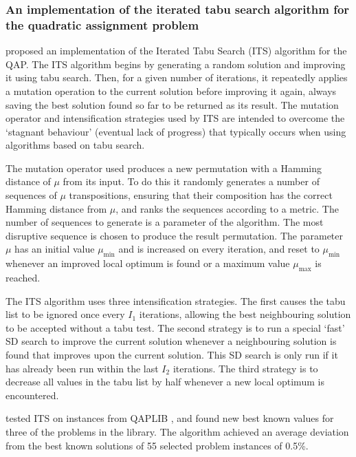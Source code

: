 {	%


    \subsubsection*{An implementation of the iterated tabu search algorithm for the quadratic assignment problem} {
    	\citet{Misevicius:2012dj} proposed an implementation of the Iterated Tabu Search (ITS) algorithm for the QAP.
    	The ITS algorithm begins by generating a random solution and improving it using tabu search. Then, for a given number of iterations, it repeatedly applies a mutation operation to the current solution before improving it again, always saving the best solution found so far to be returned as its result. The mutation operator and intensification strategies used by ITS are intended to overcome the `stagnant behaviour' (eventual lack of progress) that typically occurs when using algorithms based on tabu search.

    	The mutation operator used produces a new permutation with a Hamming distance of \(\mu\) from its input. To do this it randomly generates a number of sequences of \(\mu\) transpositions, ensuring that their composition has the correct Hamming distance from \(\mu\), and ranks the sequences according to a  metric. The number of sequences to generate is a parameter of the algorithm. The most disruptive sequence is chosen to produce the result permutation.
    	The parameter \(\mu\) has an initial value \(\mu_\text{min}\) and is increased on every iteration, and reset to \(\mu_\text{min}\) whenever an improved local optimum is found or a maximum value \(\mu_\text{max}\) is reached.

    	The ITS algorithm uses three intensification strategies.
    	The first causes the tabu list to be ignored once every \(I_1\) iterations, allowing the best neighbouring solution to be accepted without a tabu test.
    	The second strategy is to run a special `fast' SD search to improve the current solution whenever a neighbouring solution is found that improves upon the current solution. This SD search is only run if it has already been run within the last \(I_2\) iterations.
    	The third strategy is to decrease all values in the tabu list by half whenever a new local optimum is encountered.

    	\citeauthor{Misevicius:2012dj} tested ITS on instances from QAPLIB \citep{Burkard:1997ve}, and found new best known values for three of the problems in the library. The algorithm achieved an average deviation from the best known solutions of 55 selected problem instances of 0.5\%.
    }

}
